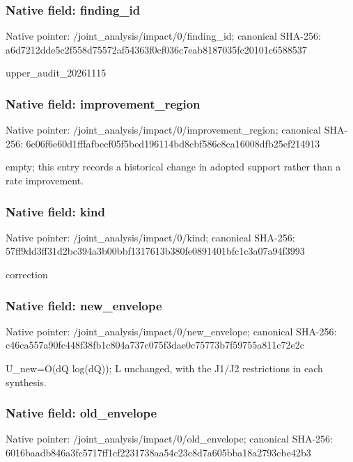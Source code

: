 \documentclass[10pt,a4paper]{article}
\begin{document}
\subsubsection{Native field: finding\_id}


Native pointer: /joint\_analysis/impact/0/finding\_id; canonical SHA-256: a6d7212dde5c2f558d75572a\allowbreak{}f54363f0cf036c7eab818703\allowbreak{}5fc20101c6588537


upper\_audit\_20261115


\subsubsection{Native field: improvement\_region}


Native pointer: /joint\_analysis/impact/0\allowbreak{}/improvement\_region; canonical SHA-256: 6c06f6e60d1fffafbecf05f5\allowbreak{}bed196114bd8cbf586c8ca16\allowbreak{}008dfb25ef214913


empty; this entry records a historical change in adopted support rather than a rate improvement.


\subsubsection{Native field: kind}


Native pointer: /joint\_analysis/impact/0/kind; canonical SHA-256: 57ff9dd3ff31d2bc394a3b00\allowbreak{}bbf1317613b380fe0891401b\allowbreak{}fc1c3a07a94f3993


correction


\subsubsection{Native field: new\_envelope}


Native pointer: /joint\_analysis/impact/0/new\_envelope; canonical SHA-256: c46ca557a90fc448f38fb1c8\allowbreak{}04a737c075f3dae0c75773b7\allowbreak{}f59755a811c72e2c


U\_new=O(dQ log(dQ)); L unchanged, with the J1/J2 restrictions in each synthesis.


\subsubsection{Native field: old\_envelope}


Native pointer: /joint\_analysis/impact/0/old\_envelope; canonical SHA-256: 6016baadb846a3fc5717ff1c\allowbreak{}f2231738aa54c23c8d7a605b\allowbreak{}ba18a2793cbe42b3
\end{document}

